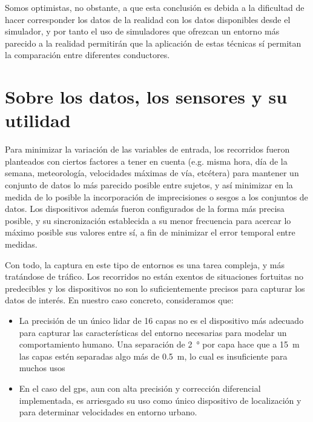 Somos optimistas, no obstante, a que esta conclusión es debida a la dificultad de hacer corresponder los datos de la realidad con los datos disponibles desde el simulador, y por tanto el uso de simuladores que ofrezcan un entorno más parecido a la realidad permitirán que la aplicación de estas técnicas sí permitan la comparación entre diferentes conductores.

\section{Sobre los datos, los sensores y su utilidad}

Para minimizar la variación de las variables de entrada, los recorridos fueron planteados con ciertos factores a tener en cuenta (e.g. misma hora, día de la semana, meteorología, velocidades máximas de vía, etcétera) para mantener un conjunto de datos lo más parecido posible entre sujetos, y así minimizar en la medida de lo posible la incorporación de imprecisiones o sesgos a los conjuntos de datos. Los dispositivos además fueron configurados de la forma más precisa posible, y su sincronización establecida a su menor frecuencia para acercar lo máximo posible sus valores entre sí, a fin de minimizar el error temporal entre medidas.

Con todo, la captura en este tipo de entornos es una tarea compleja, y más tratándose de tráfico. Los recorridos no están exentos de situaciones fortuitas no predecibles y los dispositivos no son lo suficientemente precisos para capturar los datos de interés. En nuestro caso concreto, consideramos que:

\begin{itemize}
	\item La precisión de un único \acrshort{lidar} de 16 capas no es el dispositivo más adecuado para capturar las características del entorno necesarias para modelar un comportamiento humano. Una separación de \SI{2}{\degree} por capa hace que a \SI{15}{\meter} las capas estén separadas algo más de \SI{0.5}{\meter}, lo cual es insuficiente para muchos usos
	\item En el caso del \Acrshort{gps}, aun con alta precisión y corrección diferencial implementada, es arriesgado su uso como único dispositivo de localización y para determinar velocidades en entorno urbano.
\end{itemize}

